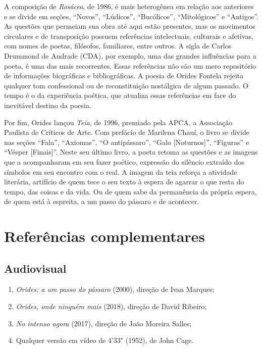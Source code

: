 \documentclass[12pt]{extarticle}
\begin{document}
A composição de \emph{Rosácea}, de 1986, é mais heterogênea em relação
aos anteriores e se divide em seções, ``Novos'', ``Lúdicos'',
``Bucólicos'', ``Mitológicos'' e ``Antigos''. As questões que permeiam
sua obra até aqui estão presentes, mas os movimentos circulares e de
transposição possuem referências intelectuais, culturais e afetivas, com
nomes de poetas, filósofos, familiares, entre outros. A sigla de Carlos
Drummond de Andrade (CDA), por exemplo, uma das grandes influências para
a poeta, é uma das mais recorrentes. Essas referências não são um mero
repositório de informações biográficas e bibliográficas. A poesia de
Orides Fontela rejeita qualquer tom confessional ou de reconstituição
nostálgica de algum passado. O tempo é o da experiência poética, que
atualiza essas referências em face do inevitável destino da poesia.

Por fim, Orides lançou \emph{Teia}, de 1996, premiado pela APCA, a
Associação Paulista de Críticos de Arte. Com prefácio de Marilena Chauí,
o livro se divide nas seções ``Fala'', ``Axiomas'', ``O antipássaro'',
``Galo {[}Noturnos{]}'', ``Figuras'' e ``Vésper {[}Finais{]}''. Neste
seu último livro, a poeta retoma as questões e as imagens que a
acompanharam em seu fazer poético, expressão do silêncio extraído dos
símbolos em seu encontro com o real. A imagem da teia reforça a
atividade literária, artifício de quem tece o seu texto à espera de
agarrar o que resta do tempo, das coisas e da vida. Ou de quem sabe da
permanência da própria espera, de quem está à espreita, a um passo do
pássaro e de acontecer.

\section{Referências complementares}

\subsection{Audiovisual}

\begin{enumerate}
\item
  \emph{Orides: a um passo do pássaro} (2000), direção de Ivan Marques;
\item
  \emph{Orides, onde ninguém mais} (2018), direção de David Ribeiro;
\item
  \emph{No intenso agora} (2017), direção de João Moreira Salles;
\item
  Qualquer versão em vídeo de 4'33" (1952), de John Cage.
\end{enumerate}
\end{document}
